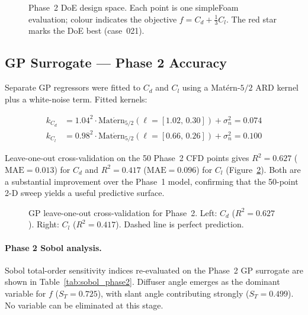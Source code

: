 \begin{figure}[h]
  \centering
  \caption{Phase~2 DoE design space. Each point is one simpleFoam evaluation; colour indicates the objective $f = C_d + \tfrac{1}{3}C_l$. The red star marks the DoE best (case~021).}
  \label{fig:doe_scatter}
\end{figure}

\subsection{GP Surrogate — Phase 2 Accuracy}
\label{sec:gp_phase2}

Separate GP regressors were fitted to $C_d$ and $C_l$ using a Mat\'{e}rn-$5/2$ ARD kernel plus a white-noise term. Fitted kernels:

\begin{align*}
  k_{C_d} &= 1.04^2 \cdot \mathrm{Mat\acute{e}rn}_{5/2}(\ell = [1.02,\,0.30]) + \sigma^2_n = 0.074 \\
  k_{C_l} &= 0.98^2 \cdot \mathrm{Mat\acute{e}rn}_{5/2}(\ell = [0.66,\,0.26]) + \sigma^2_n = 0.100
\end{align*}

Leave-one-out cross-validation on the 50 Phase~2 CFD points gives $R^2 = 0.627$ ($\mathrm{MAE} = 0.013$) for $C_d$ and $R^2 = 0.417$ ($\mathrm{MAE} = 0.096$) for $C_l$ (Figure~\ref{fig:gp_validation}). Both are a substantial improvement over the Phase~1 model, confirming that the 50-point 2-D sweep yields a useful predictive surface.

\begin{figure}[h]
  \centering
  \caption{GP leave-one-out cross-validation for Phase~2. Left: $C_d$ ($R^2=0.627$). Right: $C_l$ ($R^2=0.417$). Dashed line is perfect prediction.}
  \label{fig:gp_validation}
\end{figure}

\paragraph{Phase 2 Sobol analysis.} Sobol total-order sensitivity indices re-evaluated on the Phase~2 GP surrogate are shown in Table~\ref{tab:sobol_phase2}. Diffuser angle emerges as the dominant variable for $f$ ($S_T = 0.725$), with slant angle contributing strongly ($S_T = 0.499$). No variable can be eliminated at this stage.

